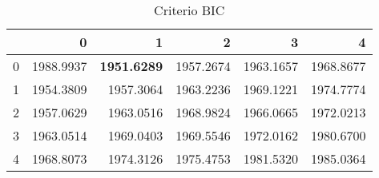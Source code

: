 \begin{table}[H]
\label{tab:autoarima_bic}
\centering
\begin{tabular}{lrrrrr}
\toprule
 & 0 & 1 & 2 & 3 & 4 \\
\midrule
0 & 1988.9937 & \textbf{1951.6289} & 1957.2674 & 1963.1657 & 1968.8677 \\
1 & 1954.3809 & 1957.3064 & 1963.2236 & 1969.1221 & 1974.7774 \\
2 & 1957.0629 & 1963.0516 & 1968.9824 & 1966.0665 & 1972.0213 \\
3 & 1963.0514 & 1969.0403 & 1969.5546 & 1972.0162 & 1980.6700 \\
4 & 1968.8073 & 1974.3126 & 1975.4753 & 1981.5320 & 1985.0364 \\
\bottomrule
\end{tabular}
\caption{Criterio BIC}
\end{table}
